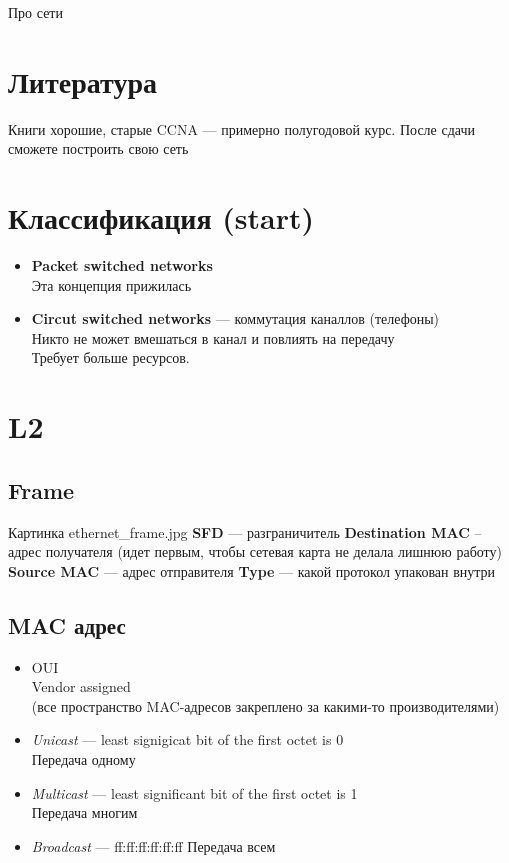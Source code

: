 Про сети

\section{Литература}
Книги хорошие, старые
CCNA --- примерно полугодовой курс. После сдачи сможете построить свою сеть

\section{Классификация (start)}
\begin{itemize} \item \textbf{Packet switched networks}\\ Эта концепция прижилась
    \item \textbf{Circut switched networks} --- коммутация каналлов (телефоны)\\
          Никто не может вмешаться в канал и повлиять на передачу\\
          Требует больше ресурсов.
\end{itemize}

\section{L2}
\subsection{Frame}
Картинка ethernet\_frame.jpg
\textbf{SFD} --- разграничитель
\textbf{Destination MAC} -- адрес получателя (идет первым, чтобы сетевая карта не делала лишнюю работу)
\textbf{Source MAC} --- адрес отправителя
\textbf{Type} --- какой протокол упакован внутри

\subsection{MAC адрес}
\begin{itemize}
    \item OUI\\
          Vendor assigned\\
          (все пространство MAC-адресов закреплено за какими-то производителями)
    \item \emph{Unicast} --- least signigicat bit of the first octet is 0\\
          Передача одному
    \item \emph{Multicast} --- least significant bit of the first octet is 1\\
          Передача многим
    \item \emph{Broadcast} --- ff:ff:ff:ff:ff:ff
          Передача всем \end{itemize} 
